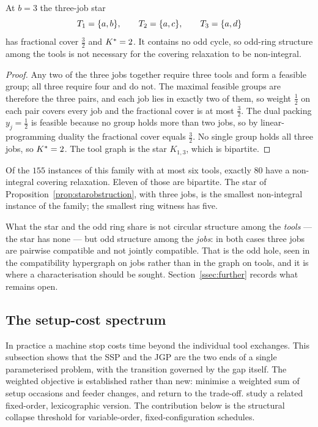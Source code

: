 \begin{proposition}\label{prop:starobstruction}
At $b=3$ the three-job star
\[
  T_1=\{a,b\},\qquad T_2=\{a,c\},\qquad T_3=\{a,d\}
\]
has fractional cover $\tfrac32$ and $K^{\ast}=2$. It contains no odd cycle, so odd-ring
structure among the tools is not necessary for the covering relaxation to be
non-integral.
\end{proposition}

\begin{proof}
Any two of the three jobs together require three tools and form a feasible group; all
three require four and do not. The maximal feasible groups are therefore the three
pairs, and each job lies in exactly two of them, so weight $\tfrac12$ on each pair
covers every job and the fractional cover is at most $\tfrac32$. The dual packing
$y_j=\tfrac12$ is feasible because no group holds more than two jobs, so by
linear-programming duality the fractional cover equals $\tfrac32$. No single group holds
all three jobs, so $K^{\ast}=2$. The tool graph is the star $K_{1,3}$, which is bipartite.
\end{proof}

\begin{observation}\label{obs:starobstruction}
Of the $155$ instances of this family with at most six tools, exactly $80$ have a
non-integral covering relaxation. Eleven of those are bipartite. The star of
Proposition~\ref{prop:starobstruction}, with three jobs, is the smallest non-integral
instance of the family; the smallest ring witness has five.
\end{observation}

What the star and the odd ring share is not circular structure among the \emph{tools} ---
the star has none --- but odd structure among the \emph{jobs}: in both cases three jobs
are pairwise compatible and not jointly compatible. That is the odd hole, seen in the compatibility hypergraph on jobs
rather than in the graph on tools, and it is where a characterisation should be sought.
Section~\ref{ssec:further} records what remains open.

\subsection{The setup-cost spectrum}\label{ssec:collapse}

In practice a machine stop costs time beyond the individual tool exchanges. This
subsection shows that the SSP and the JGP are the two ends of a single parameterised
problem, with the transition governed by the gap itself. The weighted objective is
established rather than new: \citet{Salonen2006} minimise a weighted sum of setup
occasions and feeder changes, and \citet{Burger2015} return to the trade-off.
\citet{Furrer2017} study a related fixed-order, lexicographic version. The contribution
below is the structural collapse threshold for variable-order,
fixed-configuration schedules.


